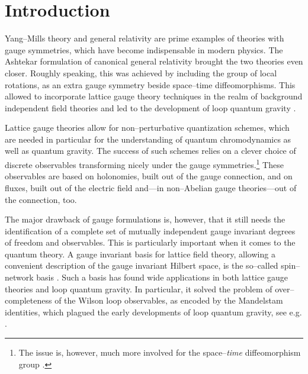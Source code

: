 \documentclass[nofootinbib,superscriptaddress,eqsecnum,tightenlines,11pt]{revtex4-1}
\begin{document}
\maketitle

\newpage

\small
\tableofcontents
\normalsize






\section{Introduction}

Yang--Mills theory and general relativity are prime examples of theories with gauge symmetries, which have become indispensable in modern physics. 
The Ashtekar formulation of canonical general relativity  \cite{AshtekarVar} brought the two theories even closer. 
Roughly speaking, this was achieved by including the group of local rotations, as an extra gauge symmetry beside  space--time diffeomorphisms. 
This allowed to incorporate lattice gauge theory techniques in the realm of background independent field theories and led to the development of loop quantum gravity \cite{LQGReviews}.

Lattice gauge theories allow for non--perturbative quantization schemes, which are needed in particular for the understanding of quantum chromodynamics as well as quantum gravity. The success of such schemes relies on a clever choice of  discrete observables \cite{WilsonG} transforming nicely under the gauge symmetries.\footnote{The issue is, however, much more involved  for the space--{\it time} diffeomorphism group \cite{BD-Diff,BD14}.}   These observables are based on holonomies, built out of the gauge connection, and on fluxes, built out of the electric field and---in non--Abelian  gauge theories---out of the connection, too. 


The major drawback of gauge formulations is, however, that it still needs the identification of a complete set of mutually independent gauge invariant degrees of freedom and observables.
This is particularly important when it comes to the quantum theory.  
A gauge invariant basis for lattice field theory, allowing a convenient description of the gauge invariant Hilbert space, is the so--called spin--network basis \cite{RovSmol}. Such a basis has found wide applications in both lattice gauge theories and loop quantum gravity. In particular, it solved the problem of over--completeness of the Wilson loop observables, as encoded by the Mandelstam identities, which plagued the early developments of loop quantum gravity,  see e.g. \cite{Loll}.  
\end{document}
